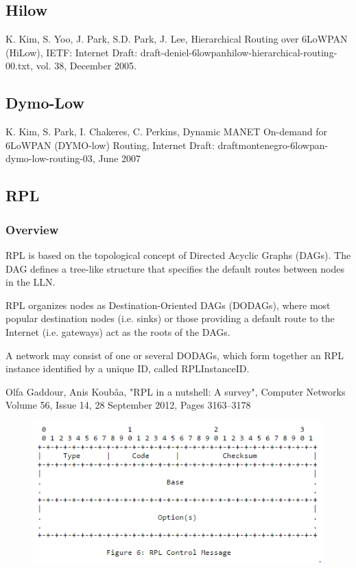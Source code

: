       \subsection{Hilow}
      K. Kim, S. Yoo, J. Park, S.D. Park, J. Lee, Hierarchical Routing over
6LoWPAN (HiLow), IETF: Internet Draft: draft-deniel-6lowpanhilow-hierarchical-routing-00.txt,
vol. 38, December 2005.

      \subsection{Dymo-Low}
      K. Kim, S. Park, I. Chakeres, C. Perkins, Dynamic MANET On-demand
for 6LoWPAN (DYMO-low) Routing, Internet Draft: draftmontenegro-6lowpan-dymo-low-routing-03,
June 2007

      \subsection{RPL}
        \subsubsection{Overview}
        RPL is based on the topological concept of Directed Acyclic
        Graphs (DAGs). The DAG defines a tree-like structure
        that specifies the default routes between nodes in the
        LLN.

        RPL organizes nodes as Destination-Oriented DAGs (DODAGs), where most
        popular destination nodes (i.e. sinks) or those providing a
        default route to the Internet (i.e. gateways) act as the roots
        of the DAGs.

        A network may consist of one or several DODAGs, which form together an
        RPL instance identified by a unique ID, called RPLInstanceID.

        Olfa Gaddour, Anis Koubâa, "RPL in a nutshell: A survey", Computer Networks
Volume 56, Issue 14, 28 September 2012, Pages 3163–3178

        \FloatBarrier
        \begin{figure}[h]
          \includegraphics[width=\textwidth]{Images/rpl_control_packet_format.png}
        \end{figure}
        \FloatBarrier

